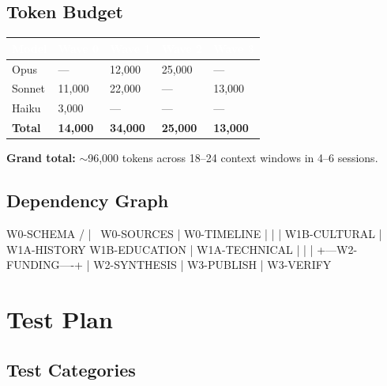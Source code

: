 \documentclass[11pt,letterpaper]{article}
\newcommand{\tableheader}[1]{\textbf{\sffamily\textcolor{white}{#1}}}
\begin{document}
\subsection{Token Budget}

\begin{center}
\begin{tabularx}{\textwidth}{L{2cm}C{2cm}C{2cm}C{2cm}C{2cm}}
\toprule
{}
\tableheader{Model} & \tableheader{Wave 0} & \tableheader{Wave 1} & \tableheader{Wave 2} & \tableheader{Wave 3} \\
\midrule
Opus & --- & 12,000 & 25,000 & --- \\
Sonnet & 11,000 & 22,000 & --- & 13,000 \\
Haiku & 3,000 & --- & --- & --- \\
\midrule
\textbf{Total} & \textbf{14,000} & \textbf{34,000} & \textbf{25,000} & \textbf{13,000} \\
\bottomrule
\end{tabularx}
\end{center}

\textbf{Grand total:} $\sim$96,000 tokens across 18--24 context windows in 4--6 sessions.

\subsection{Dependency Graph}

\begin{asciibox}
                    W0-SCHEMA
                   /    |    \
            W0-SOURCES  |   W0-TIMELINE
               |        |        |
          W1B-CULTURAL  |   W1A-HISTORY
          W1B-EDUCATION |   W1A-TECHNICAL
               |        |        |
               +---W2-FUNDING----+
                        |
                   W2-SYNTHESIS
                        |
                   W3-PUBLISH
                        |
                   W3-VERIFY
\end{asciibox}

\section{Test Plan}

\subsection{Test Categories}
\end{document}
